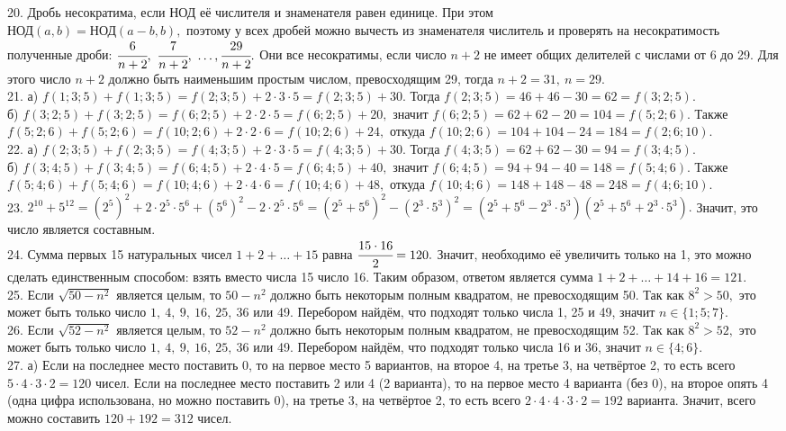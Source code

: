 \documentclass[12pt]{article}
\begin{document}
20. Дробь несократима, если НОД её числителя и знаменателя равен единице. При этом\\ НОД$(a,b)=$НОД$(a-b,b),$ поэтому у всех дробей можно вычесть из знаменателя числитель и проверять на несократимость полученные дроби: $\cfrac{6}{n+2},\ \cfrac{7}{n+2},\ \ldots, \cfrac{29}{n+2}.$ Они все несократимы, если число $n+2$ не имеет общих делителей с числами от 6 до 29. Для этого число $n+2$ должно быть наименьшим простым числом, превосходящим 29, тогда $n+2=31,\ n=29.$\\
21. а) $f(1;3;5)+f(1;3;5)=f(2;3;5)+2\cdot3\cdot5=f(2;3;5)+30.$ Тогда $f(2;3;5)=46+46-30=62=f(3;2;5).$\\
б) $f(3;2;5)+f(3;2;5)=f(6;2;5)+2\cdot2\cdot5=f(6;2;5)+20,$ значит $f(6;2;5)=62+62-20=104=f(5;2;6).$ Также
$f(5;2;6)+f(5;2;6)=f(10;2;6)+2\cdot2\cdot6=f(10;2;6)+24,$ откуда $f(10;2;6)=104+104-24=184=f(2;6;10).$\\
22. а) $f(2;3;5)+f(2;3;5)=f(4;3;5)+2\cdot3\cdot5=f(4;3;5)+30.$ Тогда $f(4;3;5)=62+62-30=94=f(3;4;5).$\\
б) $f(3;4;5)+f(3;4;5)=f(6;4;5)+2\cdot4\cdot5=f(6;4;5)+40,$ значит $f(6;4;5)=94+94-40=148=f(5;4;6).$ Также
$f(5;4;6)+f(5;4;6)=f(10;4;6)+2\cdot4\cdot6=f(10;4;6)+48,$ откуда $f(10;4;6)=148+148-48=248=f(4;6;10).$\\
23. $2^{10}+5^{12}=(2^5)^2+2\cdot2^5\cdot5^6+(5^6)^2-2\cdot2^5\cdot5^6=(2^5+5^6)^2-(2^3\cdot5^3)^2=
(2^5+5^6-2^3\cdot5^3)(2^5+5^6+2^3\cdot5^3).$ Значит, это число является составным.\\
24. Сумма первых 15 натуральных чисел $1+2+\ldots+15$ равна $\cfrac{15\cdot16}{2}=120.$ Значит, необходимо её увеличить только на 1, это можно сделать единственным способом: взять вместо числа 15 число 16. Таким образом, ответом является сумма $1+2+\ldots+14+16=121.$\\
25. Если $\sqrt{50-n^2}$ является целым, то $50-n^2$ должно быть некоторым полным квадратом, не превосходящим 50. Так как $8^2>50,$ это может быть только число $1,\ 4,\ 9,\ 16,\ 25,\ 36$ или 49. Перебором найдём, что подходят только числа 1, 25 и 49, значит $n\in\{1;5;7\}.$\\
26. Если $\sqrt{52-n^2}$ является целым, то $52-n^2$ должно быть некоторым полным квадратом, не превосходящим 52. Так как $8^2>52,$ это может быть только число $1,\ 4,\ 9,\ 16,\ 25,\ 36$ или 49. Перебором найдём, что подходят только числа 16 и 36, значит $n\in\{4;6\}.$\\
27. а) Если на последнее место поставить 0, то на первое место 5 вариантов, на второе 4, на третье 3, на четвёртое 2, то есть всего $5\cdot4\cdot3\cdot2=120$ чисел. Если на последнее место поставить 2 или 4 (2 варианта), то на первое место 4 варианта (без 0), на второе опять 4 (одна цифра использована, но можно поставить 0), на третье 3, на четвёртое 2, то есть всего $2\cdot4\cdot4\cdot3\cdot2=192$ варианта. Значит, всего можно составить $120+192=312$ чисел.\\
\end{document}
